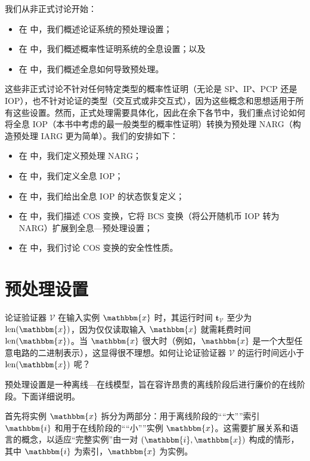 \documentclass[american,singlepageview]{snargs-book-zh}
\newcommand{\DoQuote}[1]{``#1''}
\newcommand{\BitSize}[1]{\mathrm{len}(#1)}
\newcommand{\Index}{\mathbbm{i}}
\newcommand{\Instance}{\mathbbm{x}}
\newcommand{\ProtoVerifier}{V}
\newcommand{\ARGFormat}[1]{\mathcal{#1}}
\newcommand{\ARGVerifier}{\ARGFormat{\ProtoVerifier}}
\newcommand{\ARGComplexityFormat}[1]{\mathbf{#1}}
\newcommand{\ARGTimeV}{\ARGComplexityFormat{t}_{\scriptscriptstyle\ARGVerifier}}
\begin{document}
我们从非正式讨论开始：
\begin{itemize}[nolistsep]
  \item 在  中，我们概述论证系统的预处理设置；
  \item 在  中，我们概述概率性证明系统的全息设置；以及
  \item 在  中，我们概述全息如何导致预处理。
\end{itemize}
这些非正式讨论不针对任何特定类型的概率性证明（无论是 SP、IP、PCP 还是 IOP），也不针对论证的类型（交互式或非交互式），因为这些概念和思想适用于所有这些设置。然而，正式处理需要具体化，因此在余下各节中，我们重点讨论如何将全息 IOP（本书中考虑的最一般类型的概率性证明）转换为预处理 NARG（构造预处理 IARG 更为简单）。我们的安排如下：
\begin{itemize}[nolistsep]
  \item 在  中，我们定义预处理 NARG；
  \item 在  中，我们定义全息 IOP；
  \item 在  中，我们给出全息 IOP 的状态恢复定义；
  \item 在  中，我们描述 COS 变换，它将 BCS 变换（将公开随机币 IOP 转为 NARG）扩展到全息—预处理设置；
  \item 在  中，我们讨论 COS 变换的安全性性质。
\end{itemize}

\section{预处理设置}
\label{section:motivate-preprocessing}

论证验证器 $\ARGVerifier$ 在输入实例 $\Instance$ 时，其运行时间 $\ARGTimeV$ 至少为 $\BitSize{\Instance}$，因为仅仅读取输入 $\Instance$ 就需耗费时间 $\BitSize{\Instance}$。当 $\Instance$ 很大时（例如，$\Instance$ 是一个大型任意电路的二进制表示），这显得很不理想。如何让论证验证器 $\ARGVerifier$ 的运行时间远小于 $\BitSize{\Instance}$ 呢？

预处理设置是一种离线—在线模型，旨在容许昂贵的离线阶段后进行廉价的在线阶段。下面详细说明。

首先将实例 $\Instance$ 拆分为两部分：用于离线阶段的“\DoQuote{大}”索引 $\Index$ 和用于在线阶段的“\DoQuote{小}”实例 $\Instance$。这需要扩展关系和语言的概念，以适应“完整实例”由一对 $(\Index,\Instance)$ 构成的情形，其中 $\Index$ 为索引，$\Instance$ 为实例。
\end{document}
